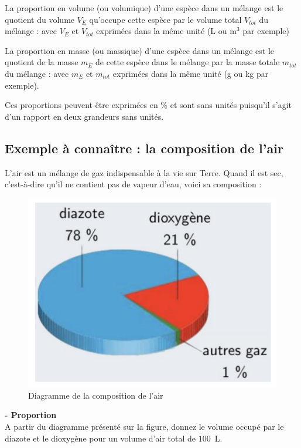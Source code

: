 \begin{tcolorbox}[colback=green!5!white,colframe=green!75!black,title=\textbf{Proportion volumique}]
La proportion en volume (ou volumique) d'une espèce dans un mélange est le quotient du volume $V_{E}$ qu'occupe cette espèce par le volume total $V_{tot}$ du mélange :
\newline
\newline
\newline
\newline
avec $V_{E}$ et $V_{tot}$ exprimées dans la même unité (L ou m$^3$ par exemple)\end{tcolorbox}

\begin{tcolorbox}[colback=green!5!white,colframe=green!75!black,title=\textbf{Proportion massique}]
La proportion en masse (ou massique) d'une espèce dans un mélange est le quotient de la masse $m_{E}$ de cette espèce dans le mélange par la masse totale $m_{tot}$ du mélange :
\newline
\newline
\newline
\newline
avec $m_{E}$ et $m_{tot}$ exprimées dans la même unité (g ou kg par exemple).
\end{tcolorbox}

Ces proportions peuvent être exprimées en \% et sont sans unités puisqu'il s'agit d'un rapport en deux grandeurs sans unités.

\subsection{Exemple à connaître : la composition de l'air}
L'air est un mélange de gaz indispensable à la vie sur Terre. Quand il est sec, c'est-à-dire qu'il ne contient pas de vapeur d'eau, voici sa composition :
\begin{figure}[!hbt]
    \centering
    \includegraphics[scale=1]{Images/Chapitre_1/Composition_air.png}
    \caption{Diagramme de la composition de l'air}
    \label{fig:compo_air}
\end{figure}

\begin{mdframed}[style=autreexo]
\textbf{ - Proportion}\\
A partir du diagramme présenté sur la figure, donnez le volume occupé par le diazote et le dioxygène pour un volume d'air total de $100$~L.
\end{mdframed}
